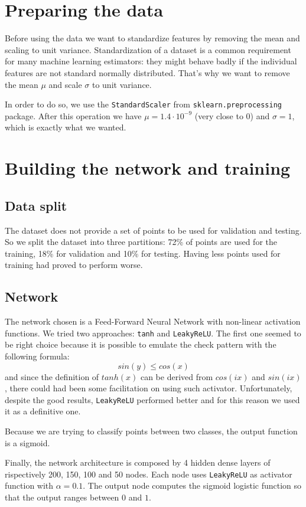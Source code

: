 \documentclass[compsoc]{IEEEtran}
\begin{document}
\section{Preparing the data}
Before using the data we want to standardize features by removing the mean and scaling to unit variance. Standardization of a dataset is a common requirement for many machine learning estimators: they might behave badly if the individual features are not standard normally distributed. That's why we want to remove the mean $\mu$ and scale $\sigma$ to unit variance. \par
In order to do so, we use the \texttt{StandardScaler} from \texttt{sklearn.preprocessing} package. After this operation we have  $\mu=1.4 \cdot 10^{-9}$ (very close to 0) and $\sigma = 1$, which is exactly what we wanted.

\section{Building the network and training}
\subsection{Data split}
The dataset does not provide a set of points to be used for validation and testing. So we split the dataset into three partitions: 72\% of points are used for the training, 18\% for validation and 10\% for testing. Having less points used for training had proved to perform worse.

\subsection{Network}
The network chosen is a Feed-Forward Neural Network with non-linear activation functions. We tried two approaches: \texttt{tanh} and \texttt{LeakyReLU}. The first one seemed to be right choice because it is possible to emulate the check pattern with the following formula:
\[sin(y) \leq cos(x)\]
and since the definition of $tanh(x)$ can be derived from $cos(ix)$ and $sin(ix)$, there could had been some facilitation on using such activator. Unfortunately, despite the good results,
\texttt{LeakyReLU} performed better and for this reason we used it as a definitive one. \par

Because we are trying to classify points between two classes, the output function is a sigmoid. \par

Finally, the network architecture is composed by 4 hidden dense layers of rispectively 200, 150, 100 and 50 nodes. Each node uses \texttt{LeakyReLU} as activator function with $\alpha=0.1$. The output node computes the sigmoid logistic function so that the output ranges between $0$ and $1$.
\end{document}

